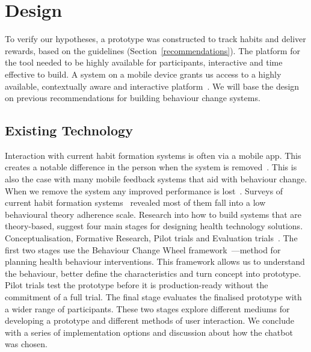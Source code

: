 \newpage
\section{Design}
To verify our hypotheses, a prototype was constructed to track habits and deliver rewards, based on the guidelines (Section~\ref{recommendations}). The platform for the tool needed to be highly available for participants, interactive and time effective to build.
A system on a mobile device grants us access to a highly available, contextually aware and interactive platform~\cite{article_my_phone_is_part_of_my_soul, article_mhealth}. We will base the design on previous recommendations for building behaviour change systems.

\subsection{Existing Technology}
Interaction with current habit formation systems is often via a mobile app. This creates a notable difference in the person when the system is removed~\cite{article_my_phone_is_part_of_my_soul}.
This is also the case with many mobile feedback systems that aid with behaviour change.
When we remove the system any improved performance is lost~\cite{article_dont_kick_habit, article_realtime_feedback_improving_medication_taking}. Surveys of current habit formation systems~\cite{survey_on_apps_2,survey_on_current_apps_of_steel, article_mhealth} revealed most of them fall into a low behavioural theory adherence scale.
Research into how to build systems that are theory-based, suggest four main stages for designing health technology solutions. Conceptualisation, Formative Research,
Pilot trials and Evaluation trials~\cite{article_mhealth}. The first two stages use the Behaviour Change Wheel framework~\cite{article_behaviour_change_wheel}---method for planning health behaviour interventions. This framework allows us to understand the behaviour, better define the characteristics and turn concept into prototype.
Pilot trials test the prototype before it is production-ready without the commitment of a full trial. The final stage evaluates the finalised prototype with a wider range of participants. These two stages explore different mediums for developing a prototype and different methods of user interaction. We conclude with a series of implementation options and discussion about how the chatbot was chosen.\newline
\newline
